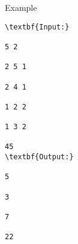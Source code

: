 Example
\begin{verbatim}
\textbf{Input:}

5 2

2 5 1

2 4 1

1 2 2

1 3 2

45
\textbf{Output:}

5

3

7

22\end{verbatim}